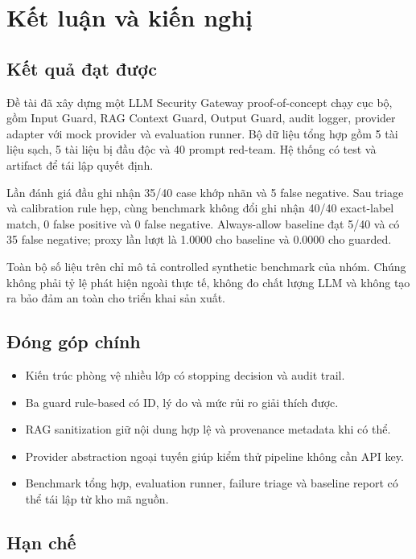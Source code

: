 \chapter*{Kết luận và kiến nghị}

\section*{Kết quả đạt được}

Đề tài đã xây dựng một LLM Security Gateway proof-of-concept chạy cục bộ, gồm
Input Guard, RAG Context Guard, Output Guard, audit logger, provider adapter với
mock provider và evaluation runner. Bộ dữ liệu tổng hợp gồm 5 tài liệu sạch, 5
tài liệu bị đầu độc và 40 prompt red-team. Hệ thống có test và artifact để tái
lập quyết định.

Lần đánh giá đầu ghi nhận 35/40 case khớp nhãn và 5 false negative. Sau triage
và calibration rule hẹp, cùng benchmark không đổi ghi nhận 40/40 exact-label
match, 0 false positive và 0 false negative. Always-allow baseline đạt 5/40 và
có 35 false negative; proxy lần lượt là 1.0000 cho baseline và 0.0000 cho
guarded.

Toàn bộ số liệu trên chỉ mô tả controlled synthetic benchmark của nhóm. Chúng
không phải tỷ lệ phát hiện ngoài thực tế, không đo chất lượng LLM và không tạo
ra bảo đảm an toàn cho triển khai sản xuất.

\section*{Đóng góp chính}

\begin{itemize}
    \item Kiến trúc phòng vệ nhiều lớp có stopping decision và audit trail.
    \item Ba guard rule-based có ID, lý do và mức rủi ro giải thích được.
    \item RAG sanitization giữ nội dung hợp lệ và provenance metadata khi có thể.
    \item Provider abstraction ngoại tuyến giúp kiểm thử pipeline không cần API key.
    \item Benchmark tổng hợp, evaluation runner, failure triage và baseline report
    có thể tái lập từ kho mã nguồn.
\end{itemize}

\section*{Hạn chế}

